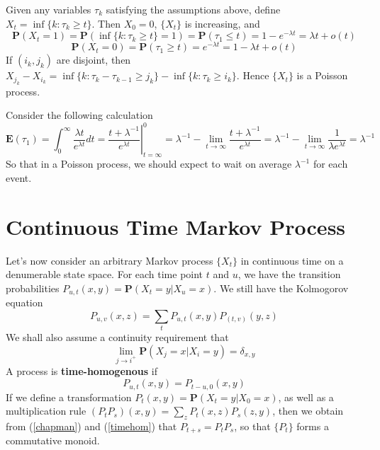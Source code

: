 Given any variables $\tau_k$ satisfying the assumptions above, define $X_t = \inf \{ k: \tau_k \geq t \}$. Then $X_0 = 0$, $\{ X_t \}$ is increasing, and
%
\[ \mathbf{P}(X_t = 1) = \mathbf{P}(\inf \{ k : \tau_k \geq t \} = 1) = \mathbf{P}(\tau_1 \leq t) = 1 - e^{-\lambda t} = \lambda t + o(t) \]
%
\[ \mathbf{P}(X_t = 0) = \mathbf{P}(\tau_1 \geq t) = e^{-\lambda t} = 1 - \lambda t + o(t) \]
%
If $(i_k, j_k)$ are disjoint, then $X_{j_k} - X_{i_k} = \inf \{ k : \tau_k - \tau_{k-1} \geq j_k \} - \inf \{ k : \tau_k \geq i_k \}$. Hence $\{ X_t \}$ is a Poisson process.

Consider the following calculation
%
\[ \mathbf{E}(\tau_1) = \int_0^\infty \frac{\lambda t}{e^{\lambda t}} dt = \left.\frac{t + \lambda^{-1}}{e^{\lambda t}} \right|_{t = \infty}^0 = \lambda^{-1} - \lim_{t \to \infty} \frac{t + \lambda^{-1}}{e^{\lambda t}} = \lambda^{-1} - \lim_{t \to \infty} \frac{1}{\lambda e^{\lambda t}} = \lambda^{-1} \]
%
So that in a Poisson process, we should expect to wait on average $\lambda^{-1}$ for each event.

\section{Continuous Time Markov Process}

Let's now consider an arbitrary Markov process $\{ X_t \}$ in continuous time on a denumerable state space. For each time point $t$ and $u$, we have the transition probabilities $P_{u,t}(x,y) = \mathbf{P}(X_t = y | X_u = x)$. We still have the Kolmogorov equation
%
\begin{equation} \label{chapman} P_{u,v}(x,z) = \sum_t P_{u,t}(x,y) P_(t,v)(y,z) \end{equation}
%
We shall also assume a continuity requirement that
%
\begin{equation} \label{continuity} \lim_{j \to i^+} \mathbf{P}(X_j = x | X_i = y) = \delta_{x,y} \end{equation}
%
A process is {\bf time-homogenous} if
%
\begin{equation} \label{timehom} P_{u,t}(x,y) = P_{t-u,0}(x,y) \end{equation}
%
If we define a transformation $P_t(x,y) = \mathbf{P}(X_t = y | X_0 = x)$, as well as a multiplication rule $(P_t P_s)(x,y) = \sum_z P_t(x,z) P_s(z,y)$, then we obtain from (\ref{chapman}) and (\ref{timehom}) that $P_{t+s} = P_t P_s$, so that $\{ P_t \}$ forms a commutative monoid.

